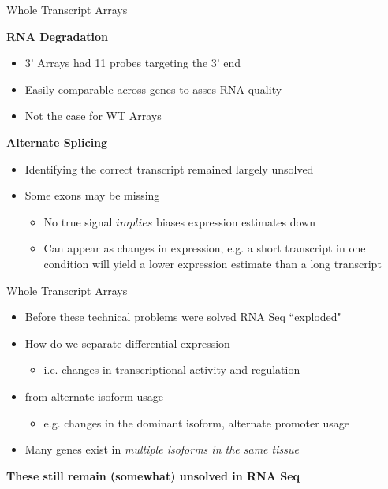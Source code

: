 \documentclass[aspectratio=169,11pt]{beamer}
\begin{document}
\begin{frame}{Whole Transcript Arrays}

\textbf{RNA Degradation}

	\begin{itemize}
		\item 3' Arrays had 11 probes targeting the 3' end
		\item Easily comparable across genes to asses RNA quality
		\item Not the case for WT Arrays
	\end{itemize}

\textbf{Alternate Splicing}

	\begin{itemize}
		\item Identifying the correct transcript remained largely unsolved
		\item Some exons may be missing
		\begin{itemize}
			\item No true signal $implies$ biases expression estimates down
			\item Can appear as changes in expression, e.g. a short transcript in one condition will yield a lower expression estimate than  a long transcript
		\end{itemize}
		
	\end{itemize}

\end{frame}

\begin{frame}{Whole Transcript Arrays}

	\begin{itemize}
		\item Before these technical problems were solved RNA Seq ``exploded"
		\item How do we separate differential expression
		\begin{itemize}
			\item i.e. changes in transcriptional activity and regulation
		\end{itemize}
		\item from alternate isoform usage
		\begin{itemize}
			\item e.g. changes in the dominant isoform, alternate promoter usage
		\end{itemize}
		\item Many genes exist in \textit{multiple isoforms in the same tissue}
	\end{itemize}
	
	\textbf{These still remain (somewhat) unsolved in RNA Seq}
	
\end{frame}
\end{document}

